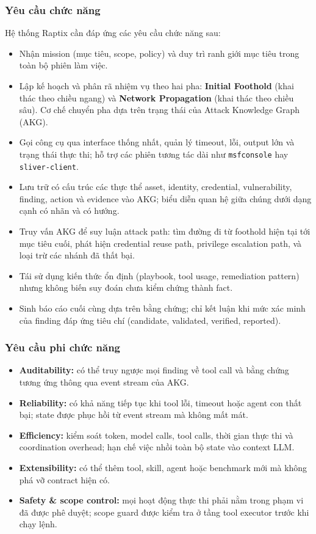 \subsubsection*{Yêu cầu chức năng}

Hệ thống Raptix cần đáp ứng các yêu cầu chức năng sau:

\begin{itemize}
    \item Nhận mission (mục tiêu, scope, policy) và duy trì ranh giới mục tiêu trong toàn bộ phiên làm việc.
    \item Lập kế hoạch và phân rã nhiệm vụ theo hai pha: \textbf{Initial Foothold} (khai thác theo chiều ngang) và \textbf{Network Propagation} (khai thác theo chiều sâu). Cơ chế chuyển pha dựa trên trạng thái của Attack Knowledge Graph (AKG).
    \item Gọi công cụ qua interface thống nhất, quản lý timeout, lỗi, output lớn và trạng thái thực thi; hỗ trợ các phiên tương tác dài như \texttt{msfconsole} hay \texttt{sliver-client}.
    \item Lưu trữ có cấu trúc các thực thể asset, identity, credential, vulnerability, finding, action và evidence vào AKG; biểu diễn quan hệ giữa chúng dưới dạng cạnh có nhãn và có hướng.
    \item Truy vấn AKG để suy luận attack path: tìm đường đi từ foothold hiện tại tới mục tiêu cuối, phát hiện credential reuse path, privilege escalation path, và loại trừ các nhánh đã thất bại.
    \item Tái sử dụng kiến thức ổn định (playbook, tool usage, remediation pattern) nhưng không biến suy đoán chưa kiểm chứng thành fact.
    \item Sinh báo cáo cuối cùng dựa trên bằng chứng; chỉ kết luận khi mức xác minh của finding đáp ứng tiêu chí (candidate, validated, verified, reported).
\end{itemize}

\subsubsection*{Yêu cầu phi chức năng}

\begin{itemize}
    \item \textbf{Auditability:} có thể truy ngược mọi finding về tool call và bằng chứng tương ứng thông qua event stream của AKG.
    \item \textbf{Reliability:} có khả năng tiếp tục khi tool lỗi, timeout hoặc agent con thất bại; state được phục hồi từ event stream mà không mất mát.
    \item \textbf{Efficiency:} kiểm soát token, model calls, tool calls, thời gian thực thi và coordination overhead; hạn chế việc nhồi toàn bộ state vào context LLM.
    \item \textbf{Extensibility:} có thể thêm tool, skill, agent hoặc benchmark mới mà không phá vỡ contract hiện có.
    \item \textbf{Safety \& scope control:} mọi hoạt động thực thi phải nằm trong phạm vi đã được phê duyệt; scope guard được kiểm tra ở tầng tool executor trước khi chạy lệnh.
\end{itemize}

